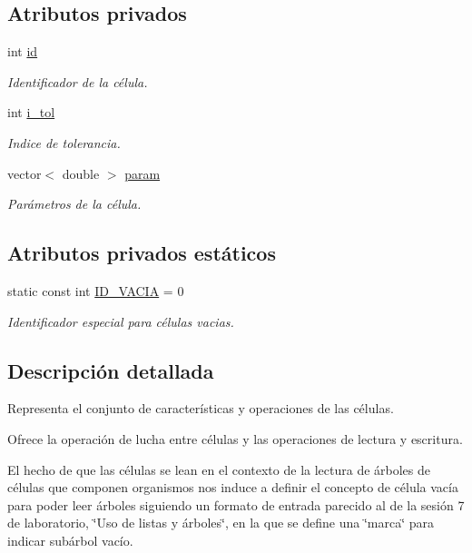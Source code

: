 \subsection*{Atributos privados}
\begin{DoxyCompactItemize}
\item 
int \hyperlink{class_celula_a0984a8b3deeed4979ed6f6141edc3c0c}{id}
\begin{DoxyCompactList}\small\item\em Identificador de la célula. \end{DoxyCompactList}\item 
int \hyperlink{class_celula_abda46be7b30a13909d9819c46238080b}{i\+\_\+tol}
\begin{DoxyCompactList}\small\item\em Indice de tolerancia. \end{DoxyCompactList}\item 
vector$<$ double $>$ \hyperlink{class_celula_a386c6da3af12b5662e3866675d60a4b7}{param}
\begin{DoxyCompactList}\small\item\em Parámetros de la célula. \end{DoxyCompactList}\end{DoxyCompactItemize}
\subsection*{Atributos privados estáticos}
\begin{DoxyCompactItemize}
\item 
static const int \hyperlink{class_celula_affff67b41ead0b1f3a3f4faad6c049ac}{I\+D\+\_\+\+V\+A\+C\+I\+A} = 0
\begin{DoxyCompactList}\small\item\em Identificador especial para células vacias. \end{DoxyCompactList}\end{DoxyCompactItemize}


\subsection{Descripción detallada}
Representa el conjunto de características y operaciones de las células. 

Ofrece la operación de lucha entre células y las operaciones de lectura y escritura.

El hecho de que las células se lean en el contexto de la lectura de árboles de células que componen organismos nos induce a definir el concepto de célula vacía para poder leer árboles siguiendo un formato de entrada parecido al de la sesión 7 de laboratorio, \char`\"{}\+Uso
de listas y árboles\char`\"{}, en la que se define una \char`\"{}marca\char`\"{} para indicar subárbol vacío. 

